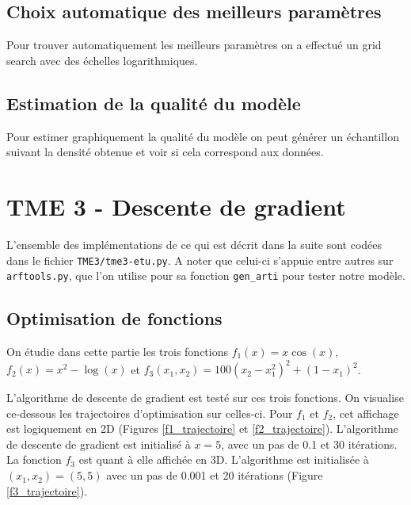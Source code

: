 \documentclass[a4paper]{article}
\begin{document}
\subsection*{Choix automatique des meilleurs paramètres}

Pour trouver automatiquement les meilleurs paramètres on a effectué un grid search avec des échelles logarithmiques.

\subsection*{Estimation de la qualité du modèle}

Pour estimer graphiquement la qualité du modèle on peut générer un échantillon suivant la densité obtenue et voir si cela correspond aux données.

\section*{TME 3 - Descente de gradient}

L'ensemble des implémentations de ce qui est décrit dans la suite sont codées dans le fichier \verb!TME3/tme3-etu.py!. A noter que celui-ci s'appuie entre autres sur \verb!arftools.py!, que l'on utilise pour sa fonction \verb!gen_arti! pour tester notre modèle.

\subsection*{Optimisation de fonctions}

On étudie dans cette partie les trois fonctions $f_1(x) = x \cos(x)$, $f_2(x) = x^2 - \log(x)$ et $f_3(x_1, x_2) = 100(x_2-x_1^2)^2 + (1-x_1)^2$.

L'algorithme de descente de gradient est testé sur ces trois fonctions. On visualise ce-dessous les trajectoires d'optimisation sur celles-ci. Pour $f_1$ et $f_2$, cet affichage est logiquement en 2D (Figures \ref{f1_trajectoire} et \ref{f2_trajectoire}). L'algorithme de descente de gradient est initialisé à $x=5$, avec un pas de 0.1 et 30 itérations. La fonction $f_3$ est quant à elle affichée en 3D. L'algorithme est initialisée à $(x_1, x_2)=(5, 5)$ avec un pas de 0.001 et 20 itérations (Figure \ref{f3_trajectoire}).
\end{document}
